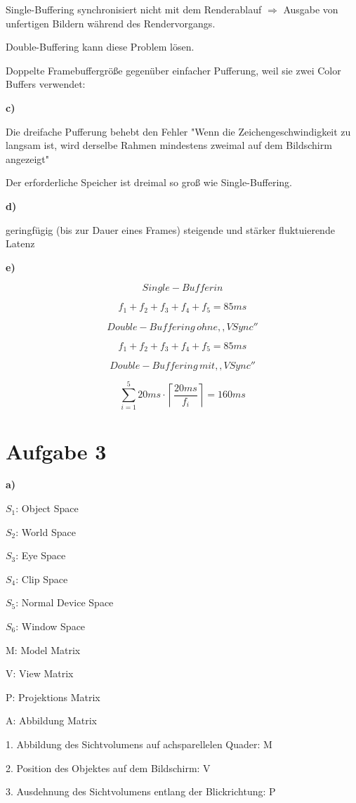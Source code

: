 \documentclass[fleqn]{article}
\begin{document}
Single-Buffering synchronisiert nicht mit dem Renderablauf $\Rightarrow$ Ausgabe von unfertigen Bildern während des Rendervorgangs.

Double-Buffering kann diese Problem lösen.

Doppelte Framebuffergröße gegenüber einfacher Pufferung, weil sie zwei Color Buffers verwendet:

\noindent\textbf{c)}

Die dreifache Pufferung behebt den Fehler "Wenn die Zeichengeschwindigkeit zu langsam ist, wird derselbe Rahmen mindestens zweimal auf dem Bildschirm angezeigt"

Der erforderliche Speicher ist dreimal so groß wie Single-Buffering.

\noindent\textbf{d)}

geringfügig (bis zur Dauer eines Frames) steigende und stärker fluktuierende Latenz

\noindent\textbf{e)}

$$Single-Bufferin$$

$$f_1+f_2+f_3+f_4+f_5=85ms$$

$$Double-Buffering\, ohne ,,VSync''$$

$$f_1+f_2+f_3+f_4+f_5=85ms$$

$$Double-Buffering\, mit ,,VSync''$$

$$\sum^5_{i=1}20ms\cdot \left\lceil\frac{20ms}{f_i}\right\rceil=160ms$$

\section{Aufgabe 3}

\noindent\textbf{a)}

$S_1$: Object Space

$S_2$: World Space

$S_3$: Eye Space

$S_4$: Clip Space

$S_5$: Normal Device Space

$S_6$: Window Space

M: Model Matrix

V: View Matrix

P: Projektions Matrix

A: Abbildung Matrix

1. Abbildung des Sichtvolumens auf achsparellelen Quader: M

2.  Position des Objektes auf dem Bildschirm: V

3.  Ausdehnung des Sichtvolumens entlang der Blickrichtung: P
\end{document}
